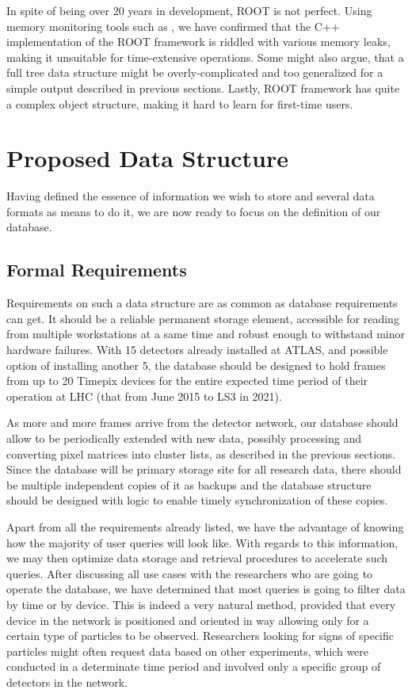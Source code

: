 In spite of being over 20 years in development, ROOT is not perfect. Using memory monitoring tools such as \cite{nethercote2007valgrind}, we have confirmed that the C++ implementation of the ROOT framework is riddled with various memory leaks, making it unsuitable for time-extensive operations. Some might also argue, that a full tree data structure might be overly-complicated and too generalized for a simple output described in previous sections. Lastly, ROOT framework has quite a complex object structure, making it hard to learn for first-time users.


\section{Proposed Data Structure}
Having defined the essence of information we wish to store and several data formats as means to do it, we are now ready to focus on the definition of our database. 

\subsection{Formal Requirements}
Requirements on such a data structure are as common as database requirements can get. It should be a reliable permanent storage element, accessible for reading from multiple workstations at a same time and robust enough to withstand minor hardware failures. With 15 detectors already installed at ATLAS, and possible option of installing another 5, the database should be designed to hold frames from up to 20 Timepix devices for the entire expected time period of their operation at LHC (that from June 2015 to LS3 in 2021).


As more and more frames arrive from the detector network, our database should allow to be periodically extended with new data, possibly processing and converting pixel matrices into cluster lists, as described in the previous sections. Since the database will be primary storage site for all research data, there should be multiple independent copies of it as backups and the database structure should be designed with logic to enable timely synchronization of these copies.

Apart from all the requirements already listed, we have the advantage of knowing how the majority of user queries will look like. With regards to this information, we may then optimize data storage and retrieval procedures to accelerate such queries. After discussing all use cases with the researchers who are going to operate the database, we have determined that most queries is going to filter data by time or by device. This is indeed a very natural method, provided that every device in the network is positioned and oriented in way allowing only for a certain type of particles to be observed. Researchers looking for signs of specific particles might often request data based on other experiments, which were conducted in a determinate time period and involved only a specific group of detectors in the network.


